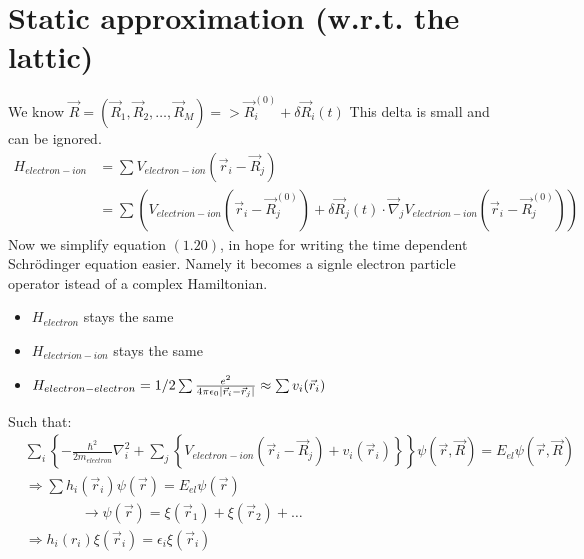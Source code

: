 \section{Static approximation (w.r.t. the lattic)}
We know $\vec{R} = (\vec{R}_1, \vec{R}_2, \dots, \vec{R}_M) => \vec{R}^{(0)}_i + \delta\vec{R}_i(t)$ This delta is small and can be ignored.
\begin{align}
	H_{electron - ion} & = \sum{V_{electron - ion}(\vec{r}_i - \vec{R}_j)} \\
	& = \sum{(V_{electrion - ion}(\vec{r}_i - \vec{R}^{(0)}_j) + \delta\vec{R}_j(t) \cdot \vec{\nabla}_j V_{electrion - ion}(\vec{r}_i - \vec{R}^{(0)}_j))}
\end{align}
Now we simplify equation $(1.20)$, in hope for writing the time dependent Schrödinger equation easier. Namely it becomes a signle electron particle operator istead of a complex Hamiltonian.
\begin{itemize}
	\setlength\itemsep{0mm}
	\item $H_{electron}$ stays the same
	\item $H_{electrion - ion}$ stays the same
	\item $H_{electron - electron} = 1/2 \sum{\frac{e^2}{4 \pi \epsilon_0 \lvert\vec{r}_i - \vec{r}_j\rvert}} \approx \sum{v_i(\vec{r}_i)}$
\end{itemize}
Such that:
\begin{align}
	& \sum_{i}^{}{\left\{-\frac{\hbar^2}{2m_{electron}} \nabla_i^2 + \sum_{j}^{}{\left\{V_{electron - ion}(\vec{r}_i- \vec{R}_j) + v_i(\vec{r}_i)\right\}}\right\}}\psi(\vec{r}, \vec{R}) = E_{el}\psi(\vec{r}, \vec{R}) \\
	& \Rightarrow \sum{h_i(\vec{r}_i)}\psi(\vec{r}) = E_{el}\psi(\vec{r}) \\
	& \qquad \qquad \longrightarrow \psi(\vec{r}) = \xi(\vec{r}_1) + \xi(\vec{r}_2) + \dots \\
	& \Rightarrow h_i(r_i)\xi(\vec{r}_i) = \epsilon_i \xi(\vec{r}_i)
\end{align}

